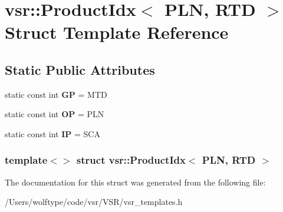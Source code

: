 \hypertarget{structvsr_1_1_product_idx_3_01_p_l_n_00_01_r_t_d_01_4}{\section{vsr\-:\-:Product\-Idx$<$ P\-L\-N, R\-T\-D $>$ Struct Template Reference}
\label{structvsr_1_1_product_idx_3_01_p_l_n_00_01_r_t_d_01_4}
}
\subsection*{Static Public Attributes}
\begin{DoxyCompactItemize}
\item 
\hypertarget{structvsr_1_1_product_idx_3_01_p_l_n_00_01_r_t_d_01_4_ad469a2ed07949b22c6035b02bf3a060c}{static const int {\bfseries G\-P} = M\-T\-D}\label{structvsr_1_1_product_idx_3_01_p_l_n_00_01_r_t_d_01_4_ad469a2ed07949b22c6035b02bf3a060c}

\item 
\hypertarget{structvsr_1_1_product_idx_3_01_p_l_n_00_01_r_t_d_01_4_a299a53f98c8ff581a4b94d3cc6100fae}{static const int {\bfseries O\-P} = P\-L\-N}\label{structvsr_1_1_product_idx_3_01_p_l_n_00_01_r_t_d_01_4_a299a53f98c8ff581a4b94d3cc6100fae}

\item 
\hypertarget{structvsr_1_1_product_idx_3_01_p_l_n_00_01_r_t_d_01_4_ae8c52f11bbd943ba0c37091485888e8a}{static const int {\bfseries I\-P} = S\-C\-A}\label{structvsr_1_1_product_idx_3_01_p_l_n_00_01_r_t_d_01_4_ae8c52f11bbd943ba0c37091485888e8a}

\end{DoxyCompactItemize}
\subsubsection*{template$<$$>$ struct vsr\-::\-Product\-Idx$<$ P\-L\-N, R\-T\-D $>$}



The documentation for this struct was generated from the following file\-:\begin{DoxyCompactItemize}
\item 
/\-Users/wolftype/code/vsr/\-V\-S\-R/vsr\-\_\-templates.\-h\end{DoxyCompactItemize}
